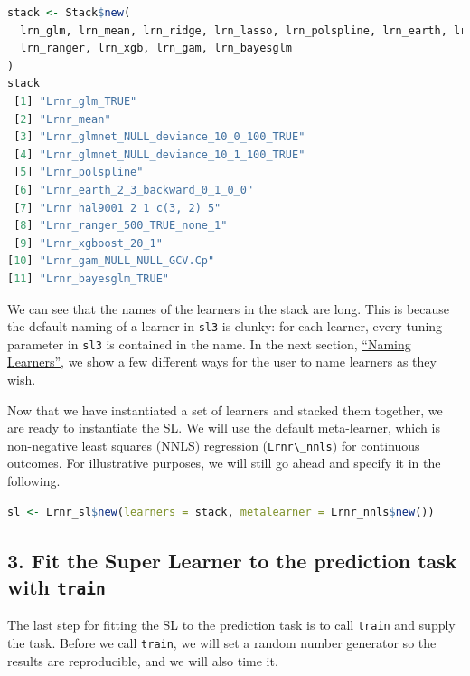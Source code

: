 \documentclass[
  12pt, krantz2,
]{krantz}
\newcommand{\passthrough}[1]{#1}
\newcommand{\1}{\mathbbm{1}}
\theoremstyle{definition}
\theoremstyle{definition}
\theoremstyle{definition}
\theoremstyle{definition}
\theoremstyle{remark}
\begin{document}
\begin{lstlisting}[language=R]
stack <- Stack$new(
  lrn_glm, lrn_mean, lrn_ridge, lrn_lasso, lrn_polspline, lrn_earth, lrn_hal, 
  lrn_ranger, lrn_xgb, lrn_gam, lrn_bayesglm
)
stack
 [1] "Lrnr_glm_TRUE"                          
 [2] "Lrnr_mean"                              
 [3] "Lrnr_glmnet_NULL_deviance_10_0_100_TRUE"
 [4] "Lrnr_glmnet_NULL_deviance_10_1_100_TRUE"
 [5] "Lrnr_polspline"                         
 [6] "Lrnr_earth_2_3_backward_0_1_0_0"        
 [7] "Lrnr_hal9001_2_1_c(3, 2)_5"             
 [8] "Lrnr_ranger_500_TRUE_none_1"            
 [9] "Lrnr_xgboost_20_1"                      
[10] "Lrnr_gam_NULL_NULL_GCV.Cp"              
[11] "Lrnr_bayesglm_TRUE"                     
\end{lstlisting}

We can see that the names of the learners in the stack are long. This is
because the default naming of a learner in \passthrough{\lstinline!sl3!} is clunky: for each learner,
every tuning parameter in \passthrough{\lstinline!sl3!} is contained in the name. In the next section,
\href{https://tlverse.org/tlverse-handbook/sl3.html\#naming-learners}{``Naming
Learners''},
we show a few different ways for the user to name learners as they wish.

Now that we have instantiated a set of learners and stacked them together, we
are ready to instantiate the SL. We will use the default meta-learner, which is
non-negative least squares (NNLS) regression (\passthrough{\lstinline!Lrnr\_nnls!}) for continuous
outcomes. For illustrative purposes, we will still go ahead and specify it
in the following.

\begin{lstlisting}[language=R]
sl <- Lrnr_sl$new(learners = stack, metalearner = Lrnr_nnls$new())
\end{lstlisting}

\hypertarget{fit-the-super-learner-to-the-prediction-task-with-train}{%
\subsection*{\texorpdfstring{3. Fit the Super Learner to the prediction task with \texttt{train}}{3. Fit the Super Learner to the prediction task with train}}\label{fit-the-super-learner-to-the-prediction-task-with-train}}


The last step for fitting the SL to the prediction task is to call \passthrough{\lstinline!train!} and
supply the task. Before we call \passthrough{\lstinline!train!}, we will set a random number generator
so the results are reproducible, and we will also time it.
\end{document}
